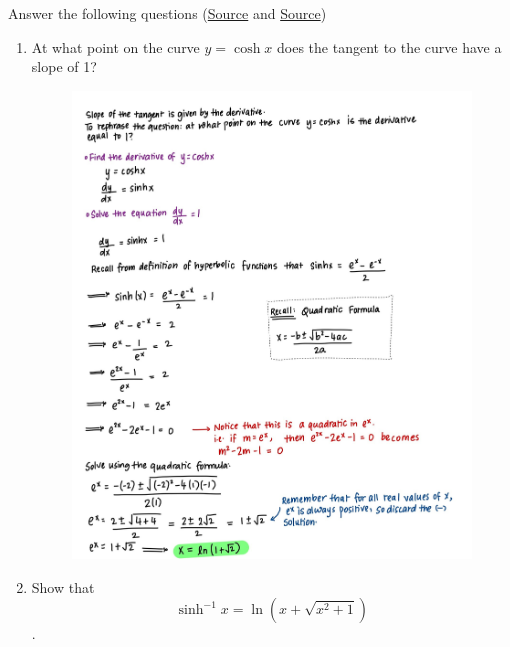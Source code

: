 \documentclass{article}
\begin{document}
\newpage \noindent 
Answer the following questions 
\newline (\href{https://www.deanza.edu/faculty/kleincharles/documents/HyperbolicFunctionsProblems.pdf}{Source} and \href{https://www.thomasbury.net/uploads/math117/examples_3.pdf}{Source})
\begin{enumerate}
    \item At what point on the curve $y = \cosh x$ does the tangent to the curve have a slope of 1?
    \begin{figure}[H]
        \centering
        \includegraphics[width=0.95\linewidth]{Q2.1.jpg}
        \label{fig:Q2.1}
    \end{figure}
    \newpage
    \item Show that $$\sinh^{-1} x = \ln(x + \sqrt{x^2 + 1})$$. 
    \begin{figure}[H]
        \centering

\end{figure}
\end{enumerate}
\end{document}
